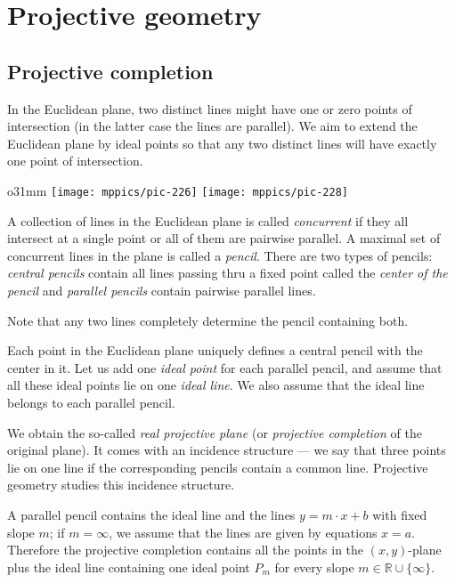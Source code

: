 \chapter{Projective geometry}\label{chap:proj}

\section{Projective completion}

In the Euclidean plane, two distinct lines might have one or zero points of intersection 
(in the latter case the lines are parallel).
We aim to extend the Euclidean plane by ideal points so that any two distinct lines will have exactly one point of intersection.

\begin{wrapfigure}{o}{31mm}
\centering
\texttt{[image: mppics/pic-226]}
\vskip4mm
\texttt{[image: mppics/pic-228]}
\end{wrapfigure}

A collection of lines in the Euclidean plane is called \emph{concurrent} if they all intersect at a single point or all of them are pairwise parallel.
A maximal set of concurrent lines in the plane is called a \emph{pencil}.
There are two types of pencils: 
\emph{central pencils} contain all lines passing thru a fixed point called the \emph{center of the pencil}
and  
\emph{parallel pencils} contain pairwise parallel lines.

Note that any two lines completely determine the pencil containing both.

Each point in the Euclidean plane uniquely defines a central pencil with the center in it.
Let us add one \emph{ideal point} for each parallel pencil,
and assume that all these ideal points lie on one \emph{ideal line}.
We also assume that the ideal line belongs to each parallel pencil.

We obtain the so-called \emph{real projective plane} (or \emph{projective completion} of the original plane). 
It comes with an incidence structure --- we say that three points lie on one line if the corresponding pencils contain a common line.
Projective geometry studies this incidence structure.

A parallel pencil contains the ideal line and the lines $y=m\cdot x+b$ with fixed slope $m$;
if $m=\infty$, we assume that the lines are given by equations $x=a$.
Therefore the projective completion contains all the points in the $(x,y)$-plane plus the ideal line containing one ideal point $P_m$ for every slope $m\in\mathbb{R}\cup\{\infty\}$.

